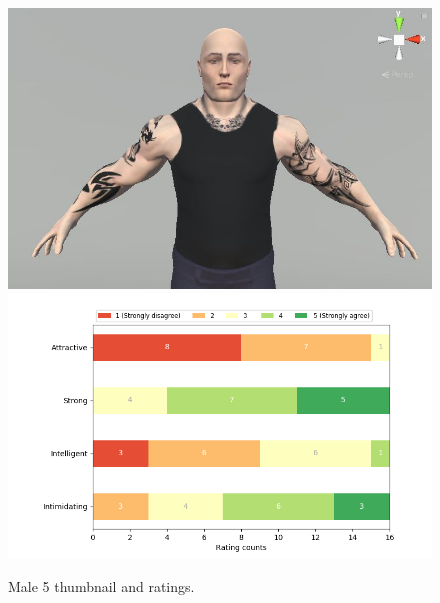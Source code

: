 \begin{figure}[H]
  \includegraphics[width=\linewidth]{Images/Males/5.JPG}
\endminipage\hfill
{}
  \includegraphics[width=\linewidth]{Survey/MRatings/avatar_m5.png}
\endminipage\hfill
\caption{Male 5 thumbnail and ratings.}
\end{figure}

